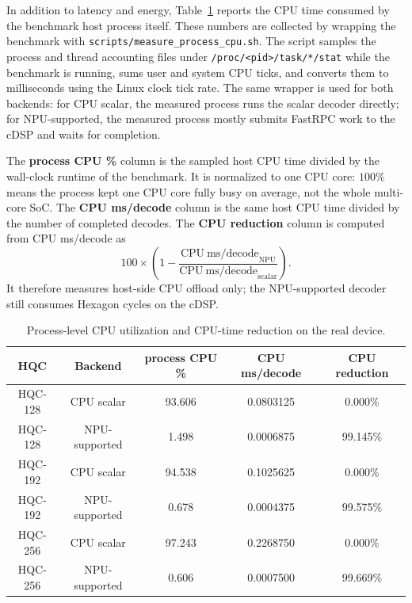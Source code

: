In addition to latency and energy, Table~\ref{tab:real-device-cpu-offload}
reports the CPU time consumed by the benchmark host process itself. These
numbers are collected by wrapping the benchmark with
\texttt{scripts/measure\_process\_cpu.sh}. The script samples the process and
thread accounting files under \texttt{/proc/<pid>/task/*/stat} while the
benchmark is running, sums user and system CPU ticks, and converts them to
milliseconds using the Linux clock tick rate. The same wrapper is used for both
backends: for CPU scalar, the measured process runs the scalar decoder directly;
for NPU-supported, the measured process mostly submits FastRPC work to the cDSP
and waits for completion.

The \textbf{process CPU \%} column is the sampled host CPU time divided by the
wall-clock runtime of the benchmark. It is normalized to one CPU core: \(100\%\)
means the process kept one CPU core fully busy on average, not the whole
multi-core SoC. The \textbf{CPU ms/decode} column is the same host CPU time
divided by the number of completed decodes. The \textbf{CPU reduction} column is
computed from CPU ms/decode as
\[
100 \times
\left(
1 -
\frac{\mathrm{CPU\ ms/decode}_{\mathrm{NPU}}}
     {\mathrm{CPU\ ms/decode}_{\mathrm{scalar}}}
\right).
\]
It therefore measures host-side CPU offload only; the NPU-supported decoder
still consumes Hexagon cycles on the cDSP.

\begin{table}[htbp]
\centering
\renewcommand{\arraystretch}{1.15}
\small
\begin{tabular}{|c|c|c|c|c|}
\hline
\textbf{HQC} & \textbf{Backend} & \textbf{process CPU \%} &
\textbf{CPU ms/decode} & \textbf{CPU reduction} \\
\hline
HQC-128 & CPU scalar    & 93.606 & 0.0803125 & 0.000\% \\
\hline
HQC-128 & NPU-supported & 1.498  & 0.0006875 & 99.145\% \\
\hline
HQC-192 & CPU scalar    & 94.538 & 0.1025625 & 0.000\% \\
\hline
HQC-192 & NPU-supported & 0.678  & 0.0004375 & 99.575\% \\
\hline
HQC-256 & CPU scalar    & 97.243 & 0.2268750 & 0.000\% \\
\hline
HQC-256 & NPU-supported & 0.606  & 0.0007500 & 99.669\% \\
\hline
\end{tabular}
\vspace{0.5em}
\caption{Process-level CPU utilization and CPU-time reduction on the real device.}
\label{tab:real-device-cpu-offload}

\end{table}

